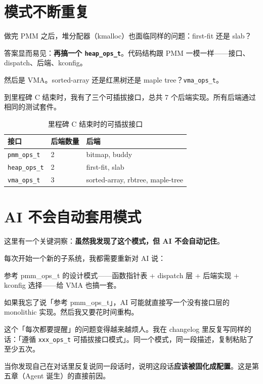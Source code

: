 \section{模式不断重复}

做完 PMM 之后，堆分配器（kmalloc）也面临同样的问题：first-fit 还是 slab？

答案显而易见：\textbf{再搞一个 \texttt{heap\_ops\_t}}。代码结构跟 PMM 一模一样——接口、dispatch、后端、kconfig。

然后是 VMA。sorted-array 还是红黑树还是 maple tree？\texttt{vma\_ops\_t}。

到里程碑 C 结束时，我有了三个可插拔接口，总共 7 个后端实现。所有后端通过相同的测试套件。

\begin{table}[H]
\centering
\begin{tabular}{llp{7cm}}
\toprule
\textbf{接口} & \textbf{后端数量} & \textbf{后端} \\
\midrule
\texttt{pmm\_ops\_t} & 2 & bitmap, buddy \\
\texttt{heap\_ops\_t} & 2 & first-fit, slab \\
\texttt{vma\_ops\_t} & 3 & sorted-array, rbtree, maple-tree \\
\bottomrule
\end{tabular}
\caption{里程碑 C 结束时的可插拔接口}
\end{table}

\section{AI 不会自动套用模式}

这里有一个关键洞察：\textbf{虽然我发现了这个模式，但 AI 不会自动记住}。

每次开始一个新的子系统，我都需要重新对 AI 说：

\begin{humanmsg}
参考 pmm\_ops\_t 的设计模式——函数指针表 + dispatch 层 + 后端实现 + kconfig 选择——给 VMA 也搞一套。
\end{humanmsg}

如果我忘了说「参考 pmm\_ops\_t」，AI 可能就直接写一个没有接口层的 monolithic 实现。然后我又要花时间重构。

这个「每次都要提醒」的问题变得越来越烦人。我在 changelog 里反复写同样的话：「遵循 \texttt{xxx\_ops\_t} 可插拔接口模式」。同一个模式，同一段描述，复制粘贴了至少五次。

\begin{lessonbox}
当你发现自己在对话里反复说同一段话时，说明这段话\textbf{应该被固化成配置}。这是第五章（Agent 诞生）的直接前因。
\end{lessonbox}


